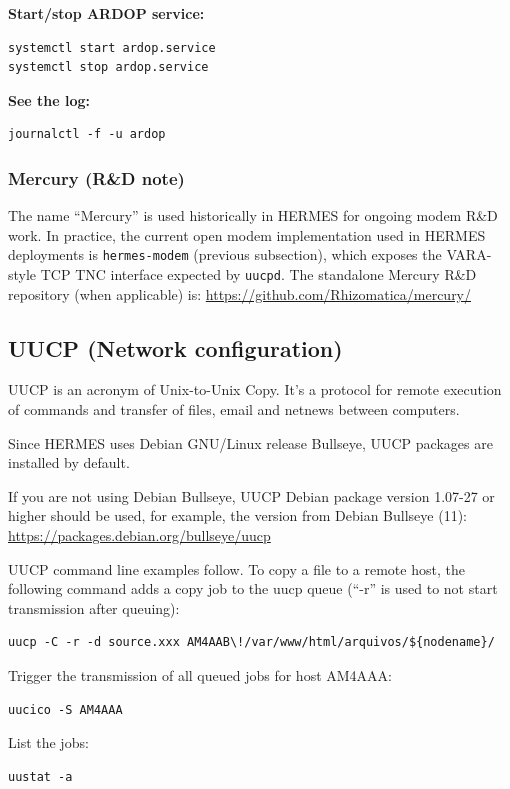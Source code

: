 \textbf{Start/stop ARDOP service:}
\begin{verbatim}
systemctl start ardop.service
systemctl stop ardop.service
\end{verbatim}


\textbf{See the log:}
\begin{verbatim}
journalctl -f -u ardop
\end{verbatim}

\subsubsection{Mercury (R\&D note)}
The name ``Mercury'' is used historically in HERMES for ongoing modem R\&D work. In practice, the current open modem implementation used in
HERMES deployments is \verb|hermes-modem| (previous subsection), which exposes the VARA-style TCP TNC interface expected by \verb|uucpd|.
The standalone Mercury R\&D repository (when applicable) is:
\url{https://github.com/Rhizomatica/mercury/}

\subsection{UUCP (Network configuration)}
UUCP is an acronym of Unix-to-Unix Copy.
It's a protocol for remote execution of commands and transfer of files, email and netnews between computers.

Since HERMES uses Debian GNU/Linux release Bullseye, UUCP packages are installed by default.

If you are not using Debian Bullseye, UUCP Debian package version 1.07-27 or higher should be used, for example,
the version from Debian Bullseye (11):
\url{https://packages.debian.org/bullseye/uucp}

UUCP command line examples follow. To copy a file to a remote host,
the following command adds a copy job to the uucp queue (``-r'' is used to
not start transmission after queuing):
\begin{verbatim}
uucp -C -r -d source.xxx AM4AAB\!/var/www/html/arquivos/${nodename}/
\end{verbatim}

Trigger the transmission of all queued jobs for host
AM4AAA:
\begin{verbatim}
uucico -S AM4AAA
\end{verbatim}

List the jobs:
\begin{verbatim}
uustat -a
\end{verbatim}

